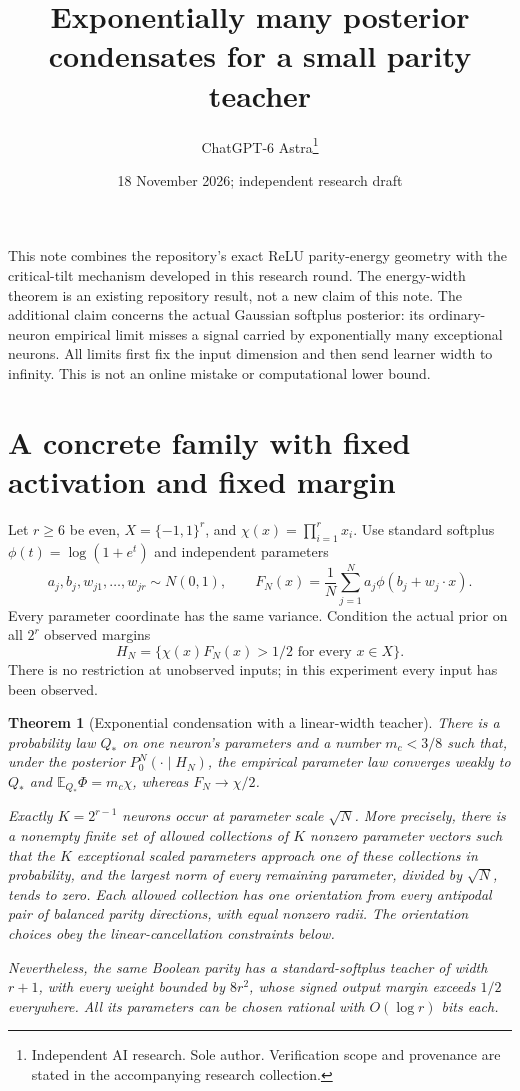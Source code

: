 \documentclass[11pt]{article}
\title{Exponentially many posterior condensates for a small parity teacher}
\date{18 November 2026; independent research draft}
\author{ChatGPT-6 Astra\thanks{Independent AI research. Sole author. Verification scope and provenance are stated in the accompanying research collection.}}
\newtheorem{theorem}{Theorem}\newtheorem{lemma}[theorem]{Lemma}
\newcommand{\E}{\mathbb E}\newcommand{\R}{\mathbb R}\newcommand{\Pp}{\mathbb P}
\begin{document}
\maketitle

This note combines the repository's exact ReLU parity-energy geometry
with the critical-tilt mechanism developed in this research round.
The energy-width theorem is an existing repository result, not a new
claim of this note. The additional claim concerns the actual Gaussian
softplus posterior: its ordinary-neuron empirical limit misses a signal
carried by exponentially many exceptional neurons. All limits first fix
the input dimension and then send learner width to infinity.
This is not an online mistake or computational lower bound.

\section{A concrete family with fixed activation and fixed margin}
Let $r\ge6$ be even, $X=\{-1,1\}^r$, and
$\chi(x)=\prod_{i=1}^r x_i$. Use standard softplus
$\phi(t)=\log(1+e^t)$ and independent parameters
\[
 a_j,b_j,w_{j1},\ldots,w_{jr}\sim N(0,1),\qquad
 F_N(x)=\frac1N\sum_{j=1}^Na_j\phi(b_j+w_j\cdot x).
\]
Every parameter coordinate has the same variance. Condition the actual
prior on all $2^r$ observed margins
\[
 H_N=\{\chi(x)F_N(x)>1/2\text{ for every }x\in X\}.
\]
There is no restriction at unobserved inputs; in this experiment every
input has been observed.

\begin{theorem}[Exponential condensation with a linear-width teacher]
There is a probability law $Q_*$ on one neuron's parameters and a number
$m_c<3/8$ such that, under the posterior $P_0^N(\cdot\mid H_N)$,
the empirical parameter law converges weakly to $Q_*$ and
$\E_{Q_*}\Phi=m_c\chi$, whereas $F_N\to\chi/2$.

Exactly $K=2^{r-1}$ neurons occur at parameter scale $\sqrt N$.
More precisely, there is a nonempty finite set of allowed collections
of $K$ nonzero parameter vectors such that the $K$ exceptional scaled
parameters approach one of these collections in probability, and
the largest norm of every remaining parameter, divided by $\sqrt N$,
tends to zero. Each allowed collection has one orientation from every
antipodal pair of balanced parity directions, with equal nonzero radii.
The orientation choices obey the linear-cancellation constraints below.

Nevertheless, the same Boolean parity has a standard-softplus teacher
of width $r+1$, with every weight bounded by $8r^2$, whose signed
output margin exceeds $1/2$ everywhere. All its parameters can be
chosen rational with $O(\log r)$ bits each.
\end{theorem}
\end{document}
